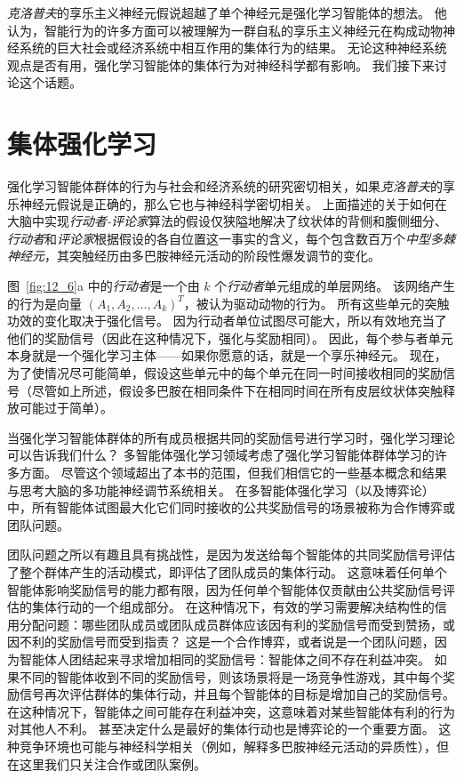 \textit{克洛普夫}的享乐主义神经元假说超越了单个神经元是强化学习智能体的想法。
他认为，智能行为的许多方面可以被理解为一群自私的享乐主义神经元在构成动物神经系统的巨大社会或经济系统中相互作用的集体行为的结果。
无论这种神经系统观点是否有用，强化学习智能体的集体行为对神经科学都有影响。
我们接下来讨论这个话题。


\section{集体强化学习} \label{sec:collective_rl}

强化学习智能体群体的行为与社会和经济系统的研究密切相关，如果\textit{克洛普夫}的享乐神经元假说是正确的，那么它也与神经科学密切相关。
上面描述的关于如何在大脑中实现\textit{行动者-评论家}算法的假设仅狭隘地解决了纹状体的背侧和腹侧细分、\textit{行动者}和\textit{评论家}根据假设的各自位置这一事实的含义，每个包含数百万个\textit{中型多棘神经元}，其突触经历由多巴胺神经元活动的阶段性爆发调节的变化。


图~\ref{fig:12_6}a 中的\textit{行动者}是一个由 $k$ 个\textit{行动者}单元组成的单层网络。
该网络产生的行为是向量 $(A_1, A_2, ..., A_k) ^T$，被认为驱动动物的行为。
所有这些单元的突触功效的变化取决于强化信号。
因为行动者单位试图尽可能大，所以有效地充当了他们的奖励信号（因此在这种情况下，强化与奖励相同）。
因此，每个参与者单元本身就是一个强化学习主体——如果你愿意的话，就是一个享乐神经元。
现在，为了使情况尽可能简单，假设这些单元中的每个单元在同一时间接收相同的奖励信号（尽管如上所述，假设多巴胺在相同条件下在相同时间在所有皮层纹状体突触释放可能过于简单）。


当强化学习智能体群体的所有成员根据共同的奖励信号进行学习时，强化学习理论可以告诉我们什么？
多智能体强化学习领域考虑了强化学习智能体群体学习的许多方面。
尽管这个领域超出了本书的范围，但我们相信它的一些基本概念和结果与思考大脑的多功能神经调节系统相关。
在多智能体强化学习（以及博弈论）中，所有智能体试图最大化它们同时接收的公共奖励信号的场景被称为合作博弈或团队问题。


团队问题之所以有趣且具有挑战性，是因为发送给每个智能体的共同奖励信号评估了整个群体产生的活动模式，即评估了团队成员的集体行动。
这意味着任何单个智能体影响奖励信号的能力都有限，因为任何单个智能体仅贡献由公共奖励信号评估的集体行动的一个组成部分。
在这种情况下，有效的学习需要解决结构性的信用分配问题：哪些团队成员或团队成员群体应该因有利的奖励信号而受到赞扬，或因不利的奖励信号而受到指责？
这是一个合作博弈，或者说是一个团队问题，因为智能体人团结起来寻求增加相同的奖励信号：智能体之间不存在利益冲突。
如果不同的智能体收到不同的奖励信号，则该场景将是一场竞争性游戏，其中每个奖励信号再次评估群体的集体行动，并且每个智能体的目标是增加自己的奖励信号。
在这种情况下，智能体之间可能存在利益冲突，这意味着对某些智能体有利的行为对其他人不利。
甚至决定什么是最好的集体行动也是博弈论的一个重要方面。
这种竞争环境也可能与神经科学相关（例如，解释多巴胺神经元活动的异质性），但在这里我们只关注合作或团队案例。


